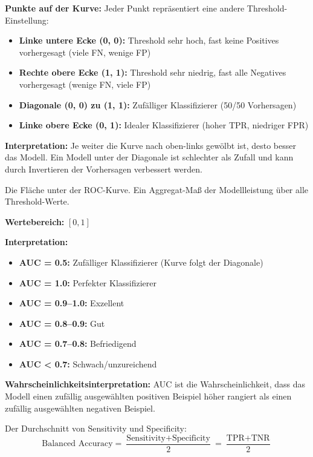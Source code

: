 \textbf{Punkte auf der Kurve:} Jeder Punkt repräsentiert eine andere Threshold-Einstellung:
\begin{itemize}[leftmargin=1.5em]
    \item \textbf{Linke untere Ecke (0, 0):} Threshold sehr hoch, fast keine Positives vorhergesagt (viele FN, wenige FP)
    \item \textbf{Rechte obere Ecke (1, 1):} Threshold sehr niedrig, fast alle Negatives vorhergesagt (wenige FN, viele FP)
    \item \textbf{Diagonale (0, 0) zu (1, 1):} Zufälliger Klassifizierer (50/50 Vorhersagen)
    \item \textbf{Linke obere Ecke (0, 1):} Idealer Klassifizierer (hoher TPR, niedriger FPR)
\end{itemize}

\textbf{Interpretation:} Je weiter die Kurve nach oben-links gewölbt ist, desto besser das Modell. Ein Modell unter der Diagonale ist schlechter als Zufall und kann durch Invertieren der Vorhersagen verbessert werden.

Die Fläche unter der ROC-Kurve. Ein Aggregat-Maß der Modellleistung über alle Threshold-Werte.

\textbf{Wertebereich:} $[0, 1]$

\textbf{Interpretation:}
\begin{itemize}[leftmargin=1.5em]
    \item \textbf{AUC = 0.5:} Zufälliger Klassifizierer (Kurve folgt der Diagonale)
    \item \textbf{AUC = 1.0:} Perfekter Klassifizierer
    \item \textbf{AUC = 0.9--1.0:} Exzellent
    \item \textbf{AUC = 0.8--0.9:} Gut
    \item \textbf{AUC = 0.7--0.8:} Befriedigend
    \item \textbf{AUC < 0.7:} Schwach/unzureichend
\end{itemize}

\textbf{Wahrscheinlichkeitsinterpretation:} AUC ist die Wahrscheinlichkeit, dass das Modell einen zufällig ausgewählten positiven Beispiel höher rangiert als einen zufällig ausgewählten negativen Beispiel.

Der Durchschnitt von Sensitivity und Specificity:
$$\text{Balanced Accuracy} = \frac{\text{Sensitivity} + \text{Specificity}}{2} = \frac{\text{TPR} + \text{TNR}}{2}$$

